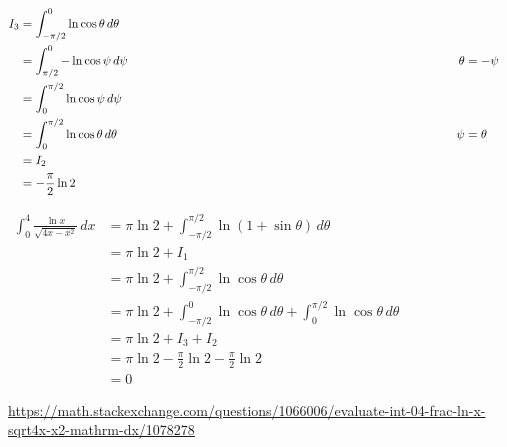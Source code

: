 \documentclass{article}
\newcommand{\explnspaceiv}{\hspace{3.61in}}
\begin{document}
\\ \\
\par\noindent
{
\setlength{\abovedisplayskip}{0pt}
\begin{fleqn}
\begin{alignat*}{2}
I_3 & = \int_{-\pi / 2}^{0} \ln \cos \theta \, d\theta \\
& = \int_{\pi / 2}^{0} -\ln \cos \psi \, d\psi & \explnspaceiv \theta & = -\psi \\
& = \int_{0}^{\pi / 2} \ln \cos \psi \, d\psi \\
& = \int_{0}^{\pi / 2} \ln \cos \theta \, d\theta & \explnspaceiv \psi & = \theta \\
& = I_2 \\
& = -\frac{\pi}{2} \ln 2
\end{alignat*}
\end{fleqn}
}
\par\noindent
$\begin{aligned}
\int_{0}^{4} \frac{\ln{x}}{\sqrt{4x - x^2}} \, dx & = \pi \ln 2 + \int_{-\pi / 2}^{\pi / 2} \ln (1 + \sin \theta) \, d\theta \\
& = \pi \ln 2 + I_1 \\
& = \pi \ln 2 + \int_{-\pi /2 }^{\pi / 2} \ln \cos \theta \, d\theta \\
& = \pi \ln 2 + \int_{-\pi / 2}^{0} \ln \cos \theta \, d\theta + \int_{0}^{\pi / 2} \ln \cos \theta \, d\theta \\
& = \pi \ln 2 + I_3 + I_2 \\
& = \pi \ln 2 - \frac{\pi}{2} \ln 2 - \frac{\pi}{2} \ln 2 \\
& = 0
\end{aligned}$

\begin{thebibliography}{9}

\url{https://math.stackexchange.com/questions/1066006/evaluate-int-04-frac-ln-x-sqrt4x-x2-mathrm-dx/1078278}

\end{thebibliography}
\end{document}
